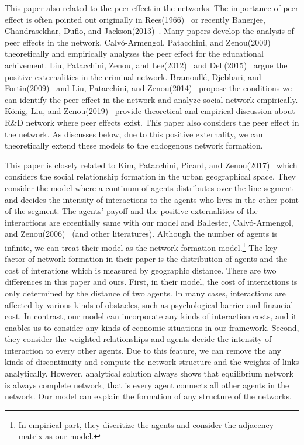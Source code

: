 \documentclass[12pt]{article}
\theoremstyle{definition}
\begin{document}
This paper also related to the peer effect in the networks.
The importance of peer effect is often pointed out originally in Rees(1966)~\cite{Rees} or recently Banerjee, Chandrasekhar, Duflo, and Jackson(2013)~\cite{ban}.
Many papers develop the analysis of peer effects in the network.
Calv\'{o}-Armengol, Patacchini, and Zenou(2009)~\cite{edu} theoretically and empirically analyzes the peer effect for the educational achivement.
Liu, Patacchini, Zenou, and Lee(2012)~\cite{criminal} and Dell(2015)~\cite{Dell} argue the positive externalities in the criminal network.
Bramoull\'{e}, Djebbari, and Fortin(2009)~\cite{identificationpeer} and Liu, Patacchini, and Zenou(2014)~\cite{endopeer} propose the conditions we can identify the peer effect in the network and analyze social network empirically.
K\"{o}nig, Liu, and Zenou(2019)~\cite {RandD} provide theoretical and empirical discussion about R\&D network where peer effects exist.
This paper also considers the peer effect in the network.
As discusses below, due to this positive externality, we can theoretically extend these models to the endogenous network formation.

This paper is closely related to Kim, Patacchini, Picard, and Zenou(2017)~\cite{Urban} which considers the social relationship formation in the urban geographical space.
They consider the model where a contiuum of agents distributes over the line segment and decides the intensity of interactions to the agents who lives in the other point of the segment.
The agents' payoff and the positive externalities of the interactions are eccentially same with our model and Ballester, Calv\'{o}-Armengol, and Zenou(2006)~\cite{whowho} (and other literatures).
Although the number of agents is infinite, we can treat their model as the network formation model.\footnote{In empirical part, they discritize the agents and consider the adjacency matrix as our model.}
The key factor of network formation in their paper is the distribution of agents and the cost of interations which is measured by geographic distance.
There are two differences in this paper and ours.
First, in their model, the cost of interactions is only determined by the distance of two agents.
In many cases, interactions are affected by various kinds of obstacles, such as psychological barrier and financial cost.
In contrast, our model can incorporate any kinds of interaction costs, and it enables us to consider any kinds of economic situations in our framework.
Second, they consider the weighted relationships and agents decide the intensity of interaction to every other agents.
Due to this feature, we can remove the any kinds of discontinuity and compute the network structure and the weights of links analytically.
However, analytical solution always shows that equilibrium network is always complete network, that is every agent connects all other agents in the network.
Our model can explain the formation of any structure of the networks.
\end{document}
